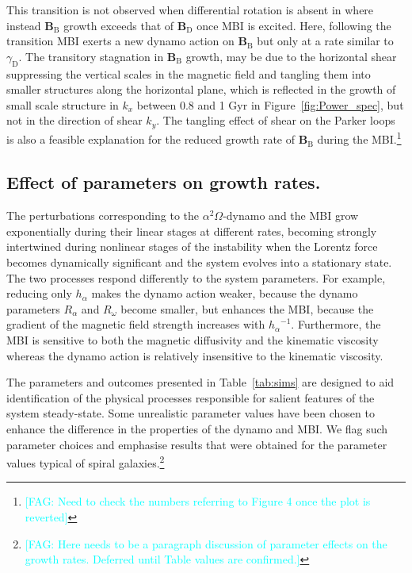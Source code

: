 \documentclass[fleqn,usenatbib]{mnras}
\newcommand{\fag}[1]{\textcolor{cyan}{[FAG: #1]}} %
\renewcommand\vec[1]{\bm{#1}}%
\newcommand{\BB}{\vec{B}} %
\begin{document}
{This transition is not observed when differential rotation is absent in
\citet{QSTGB23} where instead $\BB_\text{B}$ growth exceeds that of
$\BB_\text{D}$ once MBI is excited. Here, following the transition MBI exerts a
new dynamo action on $\BB_\text{B}$ but only at a rate similar to
$\gamma_\text{D}$.  The transitory stagnation in $\BB_\text{B}$ growth, may be
due to the horizontal shear suppressing the vertical scales in the magnetic
field and tangling them into smaller structures along the horizontal plane,
which is reflected in the growth of small scale structure in $k_x$ between 0.8
and 1 Gyr in Figure~\ref{fig:Power_spec}, but not in the direction of shear
$k_y$. The tangling effect of shear on the Parker loops is also a feasible
explanation for the reduced growth rate of $\BB_\text{B}$ during the
MBI.\footnote{\fag{Need to check the numbers referring to Figure 4 once the
plot is reverted}}}

\subsection{Effect of parameters on growth rates.}\label{sec:params}

{The perturbations corresponding to the $\alpha^2\Omega$-dynamo and the MBI}
grow exponentially during their linear stages at different rates, becoming
strongly intertwined during nonlinear stages of the instability when the
Lorentz force becomes dynamically significant and the system evolves into a
stationary state.  The two processes respond differently to the system
parameters.  For example, reducing {only} $h_\alpha$ makes the dynamo action
weaker, because the dynamo parameters $R_\alpha$ and $R_\omega$ become smaller,
but enhances the MBI, because the gradient of the magnetic field strength
increases with ${h_\alpha}^{-1}$.  Furthermore, the MBI is sensitive to both
the magnetic diffusivity and the kinematic viscosity whereas the dynamo action
is relatively insensitive to the kinematic viscosity.

The {parameters and outcomes} presented in Table~\ref{tab:sims} are designed
to {aid identification of the} physical processes responsible for salient
features of the {system} steady-state.  Some unrealistic parameter values
{have been} chosen to enhance the difference in the properties of the dynamo
and MBI. We flag such parameter choices and emphasise results {that} were
obtained for the parameter values typical of spiral galaxies.\footnote{
\fag{Here needs to be a paragraph discussion of parameter effects on the growth
rates. Deferred until Table values are confirmed.}}
\end{document}
